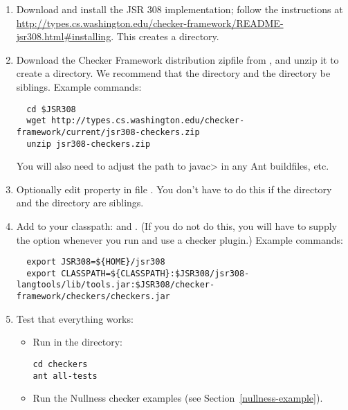 \begin{enumerate}

\item Download and install the JSR 308 implementation; follow the instructions at
{\codesize\url{http://types.cs.washington.edu/checker-framework/README-jsr308.html#installing}}.
This creates a  directory.

\item Download the Checker Framework distribution zipfile from
,
and unzip it to create a  directory.  We recommend that the
 directory and the  directory be siblings.
Example commands:

\begin{Verbatim}
  cd $JSR308
  wget http://types.cs.washington.edu/checker-framework/current/jsr308-checkers.zip
  unzip jsr308-checkers.zip
\end{Verbatim}

You will also need to adjust the path to \<javac> in any Ant buildfiles,
etc.

\item Optionally edit property  in file
  .  You don't have to do this if the
   directory and the  directory are
  siblings.

\item Add to your classpath:
   and
  .
  (If you do not do this, you will have to supply the  option
  whenever you run  and use a checker plugin.)  Example
  commands:

\begin{smaller}
\begin{Verbatim}
  export JSR308=${HOME}/jsr308
  export CLASSPATH=${CLASSPATH}:$JSR308/jsr308-langtools/lib/tools.jar:$JSR308/checker-framework/checkers/checkers.jar
\end{Verbatim}
\end{smaller}

\item Test that everything works:

  \begin{itemize}

  \item Run  in the  directory:
\begin{Verbatim}
cd checkers
ant all-tests
\end{Verbatim}

  \item Run the Nullness checker examples (see
    Section~\ref{nullness-example}).

  \end{itemize}

\end{enumerate}

